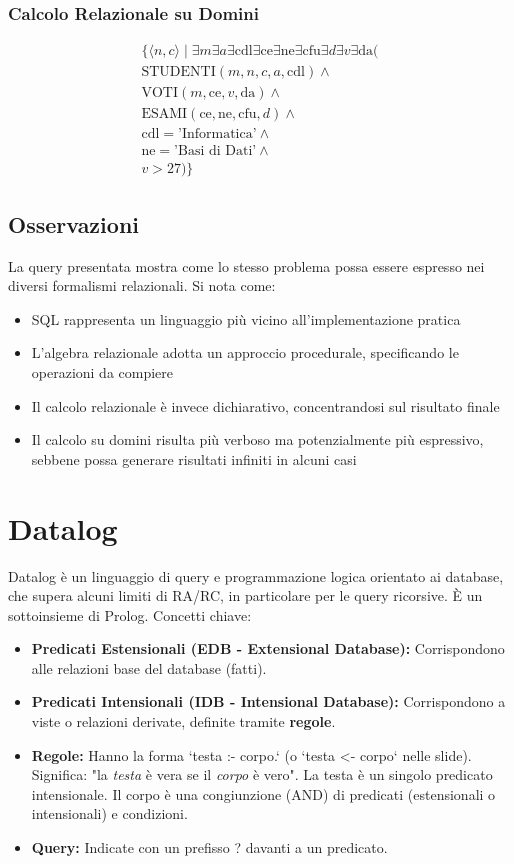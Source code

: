 \subsubsection{Calcolo Relazionale su Domini}
\begin{align}
\{\langle n, c \rangle \mid \exists m \exists a \exists \text{cdl} \exists \text{ce} \exists \text{ne} \exists \text{cfu} \exists d \exists v \exists \text{da} (\\
  \text{STUDENTI}(m, n, c, a, \text{cdl}) \wedge\\
  \text{VOTI}(m, \text{ce}, v, \text{da}) \wedge\\
  \text{ESAMI}(\text{ce}, \text{ne}, \text{cfu}, d) \wedge\\
  \text{cdl} = \text{'Informatica'} \wedge\\
  \text{ne} = \text{'Basi di Dati'} \wedge\\
  v > 27
)\}
\end{align}

\subsection{Osservazioni}
La query presentata mostra come lo stesso problema possa essere espresso nei diversi formalismi relazionali. Si nota come:
\begin{itemize}
  \item SQL rappresenta un linguaggio più vicino all'implementazione pratica
  \item L'algebra relazionale adotta un approccio procedurale, specificando le operazioni da compiere
  \item Il calcolo relazionale è invece dichiarativo, concentrandosi sul risultato finale
  \item Il calcolo su domini risulta più verboso ma potenzialmente più espressivo, sebbene possa generare risultati infiniti in alcuni casi
\end{itemize}

\section{Datalog}
Datalog è un linguaggio di query e programmazione logica orientato ai database, che supera alcuni limiti di RA/RC, in particolare per le query ricorsive. È un sottoinsieme di Prolog.
Concetti chiave:
\begin{itemize}
	\item \textbf{Predicati Estensionali (EDB - Extensional Database):} Corrispondono alle relazioni base del database (fatti).
	\item \textbf{Predicati Intensionali (IDB - Intensional Database):} Corrispondono a viste o relazioni derivate, definite tramite \textbf{regole}.
	\item \textbf{Regole:} Hanno la forma `testa :- corpo.` (o `testa <- corpo` nelle slide).
	Significa: "la \textit{testa} è vera se il \textit{corpo} è vero".
	La testa è un singolo predicato intensionale. Il corpo è una congiunzione (AND) di predicati (estensionali o intensionali) e condizioni.
	\item \textbf{Query:} Indicate con un prefisso ? davanti a un predicato.
\end{itemize}

